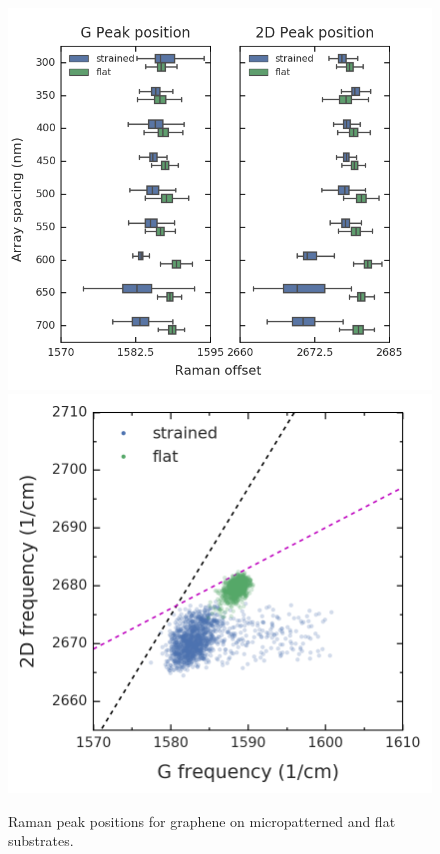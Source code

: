 \documentclass[%
 aip,
 apl,%
 amsmath,amssymb,
 reprint,%
]{revtex4-1}
\begin{document}
\begin{figure}
\centering
\includegraphics[width=\columnwidth]{raman_plot}
\includegraphics[width=0.9\columnwidth]{raman-g_vs_2d}
\caption{Raman peak positions for graphene on micropatterned and flat substrates.}
\label{'fig:raman'}
\end{figure}
\end{document}
